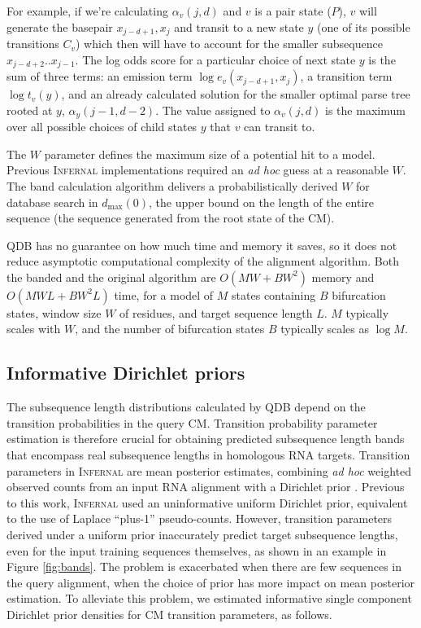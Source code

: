 \documentclass[11pt]{article}
\begin{document}
For example, if we're calculating $\alpha_v(j,d)$ and $v$ is a pair
state ($P$), $v$ will generate the basepair $x_{j-d+1},x_j$ and
transit to a new state $y$ (one of its possible transitions $C_v$)
which then will have to account for the smaller subsequence
$x_{j-d+2}..x_{j-1}$. The log odds score for a particular choice of
next state $y$ is the sum of three terms: an emission term $\log
e_v(x_{j-d+1},x_j)$, a transition term $\log t_v(y)$, and an already
calculated solution for the smaller optimal parse tree rooted at $y$,
$\alpha_y(j-1,d-2)$. The value assigned to $\alpha_v(j, d)$ is the
maximum over all possible choices of child states $y$ that $v$ can
transit to.

The $W$ parameter defines the maximum size of a potential hit to a
model. Previous \textsc{Infernal} implementations required an \emph{ad
hoc} guess at a reasonable $W$. The band calculation algorithm
delivers a probabilistically derived $W$ for database search in
$d_\mbox{max}(0)$, the upper bound on the length of the entire
sequence (the sequence generated from the root state of the CM).

QDB has no guarantee on how much time and memory it saves, so it does
not reduce asymptotic computational complexity of the alignment
algorithm.  Both the banded and the original algorithm are $O(MW +
BW^2)$ memory and $O(MWL + BW^2L)$ time, for a model of $M$ states
containing $B$ bifurcation states, window size $W$ of residues, and
target sequence length $L$.  $M$ typically scales with $W$, and the
number of bifurcation states $B$ typically scales as $\log M$.


\subsection{Informative Dirichlet priors}

The subsequence length distributions calculated by QDB depend on the
transition probabilities in the query CM. Transition probability
parameter estimation is therefore crucial for obtaining predicted
subsequence length bands that encompass real subsequence lengths in
homologous RNA targets. Transition parameters in \textsc{Infernal} are
mean posterior estimates, combining \emph{ad hoc} weighted observed
counts from an input RNA alignment with a Dirichlet prior
\cite{infguide03}.  Previous to this work, \textsc{Infernal} used an
uninformative uniform Dirichlet prior, equivalent to the use of
Laplace ``plus-1'' pseudo-counts. However, transition parameters
derived under a uniform prior inaccurately predict target subsequence
lengths, even for the input training sequences themselves, as shown in
an example in Figure \ref{fig:bands}.  The problem is exacerbated when
there are few sequences in the query alignment, when the choice of
prior has more impact on mean posterior estimation.  To alleviate this
problem, we estimated informative single component Dirichlet prior
densities for CM transition parameters, as follows.
\end{document}
